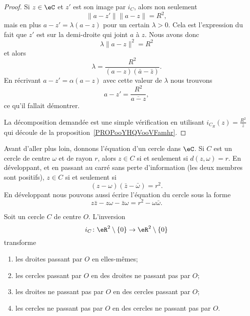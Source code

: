 \begin{proof}
	Si \( z\in \eC\) et \( z'\) est son image par \( i_C\), alors non seulement
	\begin{equation}
		\| a-z' \|\| a-z \|=R^2,
	\end{equation}
	mais en plus \( a-z'=\lambda(a-z)\) pour un certain \( \lambda>0\). Cela est l'expression du fait que \( z'\) est sur la demi-droite qui joint \( a\) à \( z\). Nous avons donc
	\begin{equation}
		\lambda\| a-z \|^2=R^2
	\end{equation}
	et alors
	\begin{equation}
		\lambda=\frac{ R^2 }{ (a-z)(\bar a-\bar z) }.
	\end{equation}
	En récrivant \( a-z'=\alpha(a-z)\) avec cette valeur de \( \lambda\) nous trouvons
	\begin{equation}
		a-z'=\frac{ R^2 }{ \overline{ a-z } },
	\end{equation}
	ce qu'il fallait démontrer.

	La décomposition demandée est une simple vérification en utilisant \( i_{C_R}(z)=\frac{ R^2 }{ \bar z }\) qui découle de la proposition~\ref{PROPooYHQVooVFamhr}.
\end{proof}

Avant d'aller plus loin, donnons l'équation d'un cercle dans \( \eC\). Si \( C\) est un cercle de centre \( \omega\) et de rayon \( r\), alors \( z\in C\) si et seulement si \( d(z,\omega)=r\). En développant, et en passant au carré sans perte d'information (les deux membres sont positifs), \( z\in C\) si et seulement si
\begin{equation}
	(z-\omega)(\bar z-\bar \omega)=r^2.
\end{equation}
En développant nous pouvons aussi écrire l'équation du cercle sous la forme
\begin{equation}		\label{EQooWZVRooXciOsA}
	z\bar z-z\omega-\bar z\omega=r^2-\omega\bar\omega.
\end{equation}

\begin{proposition}     \label{PROPooMIMRooTbQRVI}
	Soit un cercle \( C\) de centre \( O\). L'inversion
	\begin{equation}
		i_C\colon \eR^2\setminus\{ 0 \}\to \eR^2\setminus\{ 0 \}
	\end{equation}
	transforme
	\begin{enumerate}
		\item       \label{ITEMooNOXMooQYNPnv}
		      les droites passant par \( O\) en elles-mêmes;
		\item
		      les cercles passant par \( O\) en des droites ne passant pas par \( O\);
		\item       \label{ITEMooRFPSooGdJdHD}
		      les droites ne passant pas par \( O\) en des cercles passant par \( O\);
		\item
		      les cercles ne passant pas par \( O\) en des cercles ne passant pas par \( O\).
	\end{enumerate}
\end{proposition}

